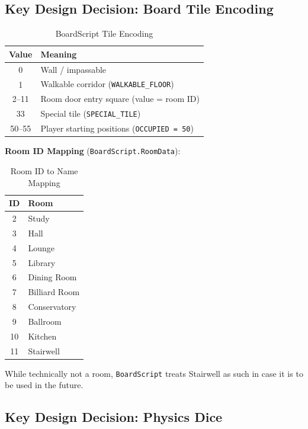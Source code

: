 \subsection*{Key Design Decision: Board Tile Encoding}

\begin{table}[H]
\centering
\caption{BoardScript Tile Encoding}
\begin{tabular}{|c|l|}
\hline
\textbf{Value} & \textbf{Meaning} \\ \hline
0 & Wall / impassable \\ \hline
1 & Walkable corridor (\texttt{WALKABLE\_FLOOR}) \\ \hline
2--11 & Room door entry square (value = room ID) \\ \hline
33 & Special tile (\texttt{SPECIAL\_TILE}) \\ \hline
50--55 & Player starting positions (\texttt{OCCUPIED = 50}) \\ \hline
\end{tabular}
\end{table}

\textbf{Room ID Mapping} (\texttt{BoardScript.RoomData}):

\begin{table}[H]
\centering
\caption{Room ID to Name Mapping }
\begin{tabular}{|c|l|}
\hline
\textbf{ID} & \textbf{Room} \\ \hline
2 & Study \\ \hline
3 & Hall \\ \hline
4 & Lounge \\ \hline
5 & Library \\ \hline
6 & Dining Room \\ \hline
7 & Billiard Room \\ \hline
8 & Conservatory \\ \hline
9 & Ballroom \\ \hline
10 & Kitchen \\ \hline
11 & Stairwell \\ \hline
\end{tabular}
\end{table}
While technically not a room, \texttt{BoardScript} treats Stairwell as such in case it is to be used in the future.

\subsection*{Key Design Decision: Physics Dice}

